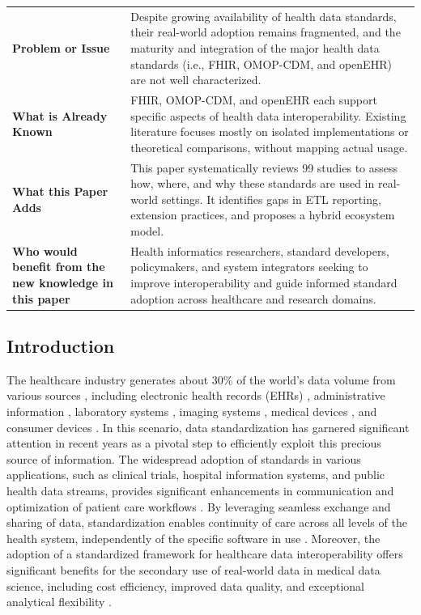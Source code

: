 \begin{table}[htbp]
\centering
\begin{tabular}{p{} p{}}
\toprule
\textbf{Problem or Issue} &
Despite growing availability of health data standards, their real-world adoption remains fragmented, and the maturity and integration of the major health data standards (i.e., FHIR, OMOP-CDM, and openEHR) are not well characterized.
\\[0.5em]
\textbf{What is Already Known} &
FHIR, OMOP-CDM, and openEHR each support specific aspects of health data interoperability. Existing literature focuses mostly on isolated implementations or theoretical comparisons, without mapping actual usage.
\\[0.5em]
\textbf{What this Paper Adds} &
This paper systematically reviews 99 studies to assess how, where, and why these standards are used in real-world settings. It identifies gaps in ETL reporting, extension practices, and proposes a hybrid ecosystem model.
\\[0.5em]
\textbf{Who would benefit from the new knowledge in this paper} &
Health informatics researchers, standard developers, policymakers, and system integrators seeking to improve interoperability and guide informed standard adoption across healthcare and research domains.
\\
\bottomrule
\end{tabular}
\end{table}

\subsection{Introduction}
\label{sec:paper1_introduction}

The healthcare industry generates about 30\% of the world's data volume \cite{thomason_data_2024} from various sources \cite{leavy_data_2019}, including electronic health records (EHRs) \cite{wang_electronic_2023}, administrative information \cite{cadarette_introduction_2015}, laboratory systems \cite{harrison_role_2008}, imaging systems \cite{noauthor_medical_2018}, medical devices \cite{moscato_wrist_2022,arcobelli_enhancing_2024,arcobelli_mcrutch_2023}, and consumer devices \cite{piwek_rise_2016}. In this scenario, data standardization has garnered significant attention in recent years as a pivotal step to efficiently exploit this precious source of information. The widespread adoption of standards in various applications, such as clinical trials, hospital information systems, and public health data streams, provides significant enhancements in communication and optimization of patient care workflows \cite{pimenta_interoperability_2023}. By leveraging seamless exchange and sharing of data, standardization enables continuity of care across all levels of the health system, independently of the specific software in use \cite{torab-miandoab_interoperability_2023}. Moreover, the adoption of a standardized framework for healthcare data interoperability offers significant benefits for the secondary use of real-world data in medical data science, including cost efficiency, improved data quality, and exceptional analytical flexibility \cite{gehrmann_what_2023}.

